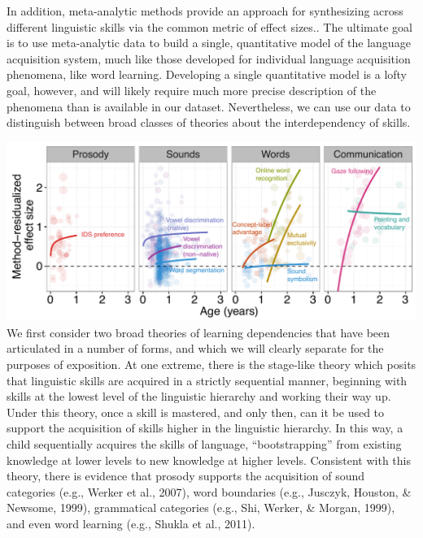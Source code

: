 \documentclass[english,floatsintext,man]{apa6}
\theoremstyle{definition}
\theoremstyle{definition}
\theoremstyle{remark}
\begin{document}
In addition, meta-analytic methods provide an approach for synthesizing
across different linguistic skills via the common metric of effect
sizes.. The ultimate goal is to use meta-analytic data to build a
single, quantitative model of the language acquisition system, much like
those developed for individual language acquisition phenomena, like word
learning. Developing a single quantitative model is a lofty goal,
however, and will likely require much more precise description of the
phenomena than is available in our dataset. Nevertheless, we can use our
data to distinguish between broad classes of theories about the
interdependency of skills.

\includegraphics{figs/fig3_lab.pdf} We first consider two broad theories
of learning dependencies that have been articulated in a number of
forms, and which we will clearly separate for the purposes of
exposition. At one extreme, there is the stage-like theory which posits
that linguistic skills are acquired in a strictly sequential manner,
beginning with skills at the lowest level of the linguistic hierarchy
and working their way up. Under this theory, once a skill is mastered,
and only then, can it be used to support the acquisition of skills
higher in the linguistic hierarchy. In this way, a child sequentially
acquires the skills of language, \enquote{bootstrapping} from existing
knowledge at lower levels to new knowledge at higher levels. Consistent
with this theory, there is evidence that prosody supports the
acquisition of sound categories (e.g., Werker et al., 2007), word
boundaries (e.g., Jusczyk, Houston, \& Newsome, 1999), grammatical
categories (e.g., Shi, Werker, \& Morgan, 1999), and even word learning
(e.g., Shukla et al., 2011).
\end{document}
